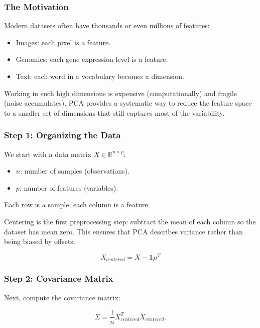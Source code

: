 \documentclass[
  letterpaper,
  DIV=11,
  numbers=noendperiod]{scrreprt}
\providecommand{\tightlist}{%
  \setlength{\itemsep}{0pt}\setlength{\parskip}{0pt}}
\begin{document}
\subsubsection{The Motivation}\label{the-motivation}

Modern datasets often have thousands or even millions of features:

\begin{itemize}
\tightlist
\item
  Images: each pixel is a feature.
\item
  Genomics: each gene expression level is a feature.
\item
  Text: each word in a vocabulary becomes a dimension.
\end{itemize}

Working in such high dimensions is expensive (computationally) and
fragile (noise accumulates). PCA provides a systematic way to reduce the
feature space to a smaller set of dimensions that still captures most of
the variability.

\subsubsection{Step 1: Organizing the
Data}\label{step-1-organizing-the-data}

We start with a data matrix \(X \in \mathbb{R}^{n \times p}\):

\begin{itemize}
\tightlist
\item
  \(n\): number of samples (observations).
\item
  \(p\): number of features (variables).
\end{itemize}

Each row is a sample; each column is a feature.

Centering is the first preprocessing step: subtract the mean of each
column so the dataset has mean zero. This ensures that PCA describes
variance rather than being biased by offsets.

\[
X_{centered} = X - \mathbf{1}\mu^T
\]

\subsubsection{Step 2: Covariance
Matrix}\label{step-2-covariance-matrix}

Next, compute the covariance matrix:

\[
\Sigma = \frac{1}{n} X_{centered}^T X_{centered}.
\]
\end{document}
